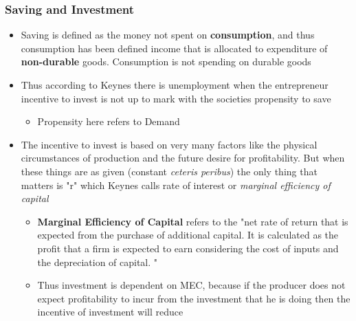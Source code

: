 \documentclass[11pt]{article}
\begin{document}
\subsubsection{Saving and Investment}
\label{sec:org00ea97b}
\begin{itemize}
\item Saving is defined as the money not spent on \textbf{consumption}, and thus consumption has been defined income that is allocated to expenditure of \textbf{non-durable} goods. Consumption is not spending on durable goods
\item Thus according to Keynes there is unemployment when the entrepreneur incentive to invest is not up to mark with the societies propensity to save
\begin{itemize}
\item Propensity here refers to Demand
\end{itemize}
\item The incentive to invest is based on very many factors like the physical circumstances of production and the future desire for profitability. But when these things are as given (constant \emph{ceteris peribus}) the only thing that matters is "r" which Keynes calls rate of interest or \emph{marginal efficiency of capital}
\begin{itemize}
\item \textbf{Marginal Efficiency of Capital} refers to the "net rate of return that is expected from the purchase of additional capital. It is calculated as the profit that a firm is expected to earn considering the cost of inputs and the depreciation of capital. "
\item Thus investment is dependent on MEC, because if the producer does not expect profitability to incur from the investment that he is doing then the incentive of investment will reduce
\end{itemize}
\end{itemize}
\end{document}
